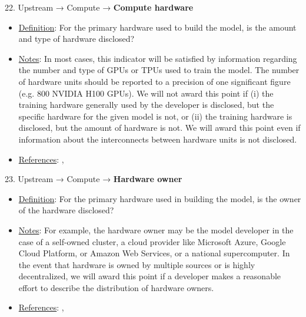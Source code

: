 22. Upstream → Compute → \textbf{Compute hardware}
\vspace{-\parskip}
\begin{itemize}
\item
\underline{Definition}: For the primary hardware used to build the model, is the amount and type of hardware disclosed?
\item
\underline{Notes}: In most cases, this indicator will be satisfied by information regarding the number and type of GPUs or TPUs used to train the model. The number of hardware units should be reported to a precision of one significant figure (e.g. 800 NVIDIA H100 GPUs). We will not award this point if (i) the training hardware generally used by the developer is disclosed, but the specific hardware for the given model is not, or (ii) the training hardware is disclosed, but the amount of hardware is not. We will award this point even if information about the interconnects between hardware units is not disclosed.
\item
\underline{References}: \citet{sevilla2022compute}, \citet{hoffmann2022training}
\end{itemize} \vspace{\baselineskip}


23. Upstream → Compute → \textbf{Hardware owner}
\vspace{-\parskip}
\begin{itemize}
\item
\underline{Definition}: For the primary hardware used in building the model, is the owner of the hardware disclosed?
\item
\underline{Notes}: For example, the hardware owner may be the model developer in the case of a self-owned cluster, a cloud provider like Microsoft Azure, Google Cloud Platform, or Amazon Web Services, or a national supercomputer. In the event that hardware is owned by multiple sources or is highly decentralized, we will award this point if a developer makes a reasonable effort to describe the distribution of hardware owners.
\item
\underline{References}: \citet{sevilla2022compute}, \citet{hoffmann2022training}
\end{itemize} \vspace{\baselineskip}


